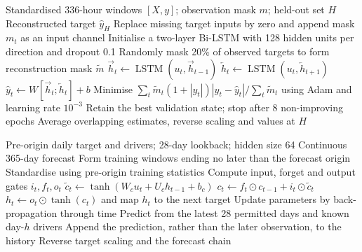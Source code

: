 \begin{algorithm}[H]
\caption{Bidirectional LSTM gap reconstruction}
\label{alg:app-bilstm}
\small
\begin{algorithmic}[1]
\Require Standardised 336-hour windows $[X,y]$; observation mask $m$;
held-out set $H$
\Ensure Reconstructed target $\hat y_H$
\State Replace missing target inputs by zero and append mask $m_t$ as an input channel
\State Initialise a two-layer Bi-LSTM with 128 hidden units per direction and dropout 0.1
    \State Randomly mask 20\% of observed targets to form reconstruction mask $\widetilde m$
    \State $\overrightarrow h_t\gets\operatorname{LSTM}(u_t,\overrightarrow h_{t-1})$
    \State $\overleftarrow h_t\gets\operatorname{LSTM}(u_t,\overleftarrow h_{t+1})$
    \State $\hat y_t\gets W[\overrightarrow h_t;\overleftarrow h_t]+b$
    \State Minimise
    $\sum_t\widetilde m_t(1+|y_t|)|y_t-\hat y_t|/\sum_t\widetilde m_t$
    using Adam and learning rate $10^{-3}$
    \State Retain the best validation state; stop after 8 non-improving epochs
\EndFor
\State Average overlapping estimates, reverse scaling and \Return values at $H$
\end{algorithmic}
\end{algorithm}

\begin{algorithm}[H]
\caption{Causal LSTM forecasting}
\label{alg:app-lstm-forecast}
\small
\begin{algorithmic}[1]
\Require Pre-origin daily target and drivers; 28-day lookback; hidden size 64
\Ensure Continuous 365-day forecast
\State Form training windows ending no later than the forecast origin
\State Standardise using pre-origin training statistics
    \State Compute input, forget and output gates $i_t,f_t,o_t$
    \State $\widetilde c_t\gets\tanh(W_cu_t+U_ch_{t-1}+b_c)$
    \State $c_t\gets f_t\odot c_{t-1}+i_t\odot\widetilde c_t$
    \State $h_t\gets o_t\odot\tanh(c_t)$ and map $h_t$ to the next target
    \State Update parameters by back-propagation through time
\EndFor
{}
    \State Predict from the latest 28 permitted days and known day-$h$ drivers
    \State Append the prediction, rather than the later observation, to the history
\EndFor
\State Reverse target scaling and \Return the forecast chain
\end{algorithmic}
\end{algorithm}

